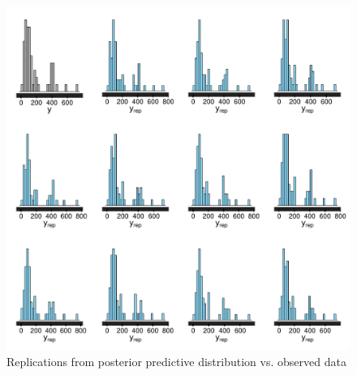 \begin{figure}[h]
\centering
	\includegraphics[scale=0.6]{sections/figs/ck_pp_y_vs_yrep_hists}
\caption{Replications from posterior predictive distribution vs. observed data}
\label{fig:ck_pp_hists}
\end{figure}

